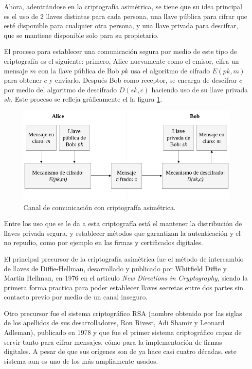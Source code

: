   Ahora, adentrándose en la criptografía asimétrica, se tiene que su idea
  principal es el uso de 2 llaves distintas para cada persona, una llave
  pública para cifrar que esté disponible para cualquier otra persona, y una
  llave privada para descifrar, que se mantiene disponible solo para su
  propietario.

  El proceso para establecer una comunicación segura por medio de este tipo
  de criptografía es el siguiente: primero, Alice nuevamente como el emisor,
  cifra un mensaje $m$ con la llave pública de Bob $pk$ usa el algoritmo de
  cifrado $E(pk,m)$ para obtener $c$ y enviarlo. Después Bob como receptor,
  se encarga de descifrar $c$ por medio del algoritmo de descifrado
  $D(sk,c)$ haciendo uso de su llave privada $sk$. Este proceso se refleja
  gráficamente el la figura \ref{cripto_asimetrica}.

  \begin{figure}[H]
    \begin{center}
      \includegraphics[width=0.8\linewidth]
        {contenidos/antecedentes/intro/img/cripto_asimetrica.png}
      \caption{Canal de comunicación con criptografía asimétrica.}
      \label{cripto_asimetrica}
    \end{center}
  \end{figure}

  Entre los uso que se le da a esta criptografía está el mantener la
  distribución de llaves privada segura, y establecer métodos que garantizan
  la autenticación y el no repudio, como por ejemplo en las firmas y
  certificados digitales.

  El principal precursor de la criptografía asimétrica fue el método de 
  intercambio de llaves de Diffie-Hellman, desarrollado y publicado por 
  Whitfield Diffie y Martin Hellman, en 1976 en el articulo \textit{New 
  Directions in Cryptography}, siendo la primera forma practica para poder 
  establecer llaves secretas entre dos partes sin contacto previo por medio 
  de un canal inseguro.

  Otro precursor fue el sistema criptográfico RSA (nombre obtenido por las 
  siglas de los apellidos de sus desarrolladores, Ron Rivest, Adi Shamir y 
  Leonard Adleman), publicado en 1978 y que fue el primer sistema criptográfico 
  capaz de servir tanto para cifrar mensajes, cómo para la implementación de 
  firmas digitales. A pesar de que sus orígenes son de ya hace casi cuatro 
  décadas, este sistema aun es uno de los más ampliamente usados.

